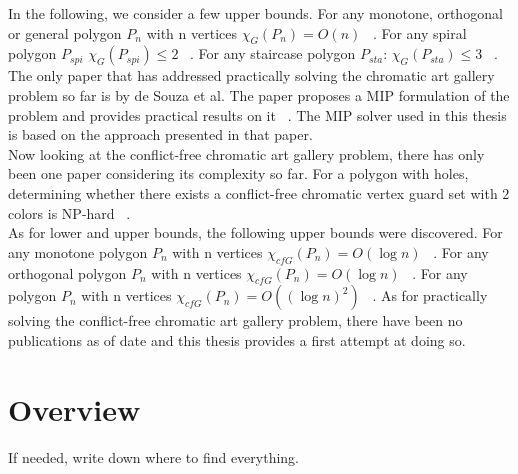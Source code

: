 In the following, we consider a few upper bounds.
For any monotone, orthogonal or general polygon $P_n$ with n vertices $\chi_G(P_n) = O(n)$ ~\cite{bartschi2011coloring}.
For any spiral polygon $P_{spi}$ $\chi_G(P_{spi}) \leq 2$ ~\cite{erickson2012art}.
For any staircase polygon $P_{sta}$: $\chi_G(P_{sta}) \leq 3$ ~\cite{erickson2012art}.\\
The only paper that has addressed practically solving the chromatic art gallery problem so far is by de Souza et al. The paper proposes a MIP formulation of the problem and provides practical results on it ~\cite{zambon2014exact}. The MIP solver used in this thesis is based on the approach presented in that paper.\\
Now looking at the conflict-free chromatic art gallery problem, there has only been one paper considering its complexity so far.
For a polygon with holes, determining whether there exists a conflict-free chromatic vertex guard set with $2$ colors is NP-hard ~\cite{iwamoto2022vertex}.\\
As for lower and upper bounds, the following upper bounds were discovered.
For any monotone polygon $P_n$ with n vertices $\chi_{cfG}(P_n) = O(\log n)$ ~\cite{bartschi2011coloring}.
For any orthogonal polygon $P_n$ with n vertices $\chi_{cfG}(P_n) = O(\log n)$ ~\cite{bartschi2011coloring}.
For any polygon $P_n$ with n vertices $\chi_{cfG}(P_n) = O((\log n)^2)$ ~\cite{bartschi2011coloring}.
As for practically solving the conflict-free chromatic art gallery problem, there have been no publications as of date and this thesis provides a first attempt at doing so.


\section{Overview}
If needed, write down where to find everything.